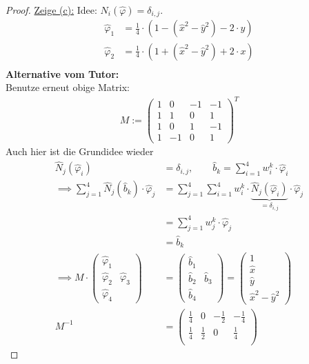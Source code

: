 \documentclass[12pt,a4paper]{article}
\begin{document}
\begin{proof}
\underline{Zeige (c):} 
Idee: $N_i(\hat{\varphi})=\delta_{i,j}$.
\begin{align*}
\hat{\varphi}_1&=\frac{1}{4}\cdot\left(1-\left(\hat{x}^2-\hat{y}^2\right)-2\cdot y\right)\\
\hat{\varphi}_2&=\frac{1}{4}\cdot\left(1+\left(\hat{x}^2-\hat{y}^2\right)+2\cdot x\right)\\
\end{align*}
\textbf{Alternative vom Tutor:}\\
Benutze erneut obige Matrix:
\begin{align*}
M:=\begin{pmatrix}
1 & 0 & -1 & -1\\
1 & 1 & 0 & 1\\
 1 & 0 & 1 & -1\\
 1 & -1 & 0 & 1
\end{pmatrix}^T
\end{align*}
Auch hier ist die Grundidee wieder 
\begin{align*}
\hat{N}_j(\hat{\varphi}_i)&=\delta_{i,j},\qquad
\hat{b}_k=\sum\limits_{i=1}^4 w_i^k\cdot\hat{\varphi}_i\\
\implies
\sum\limits_{j=1}^4\hat{N}_j(\hat{b}_k)\cdot\hat{\varphi}_j
&=\sum\limits_{j=1}^4\sum\limits_{i=1}^4 w_i^k\cdot\underbrace{\hat{N}_j(\hat{\varphi}_i)}_{=\delta_{i,j}}\cdot\hat{\varphi}_j\\
&=\sum\limits_{j=1}^4 w_j^k\cdot\hat{\varphi}_j\\
&=\hat{b}_k\\
\implies
M\cdot\begin{pmatrix}
\hat{\varphi}_1\\ \hat{\varphi}_2 & \hat{\varphi}_3 \\ \hat{\varphi}_4
\end{pmatrix}
&=\begin{pmatrix}
\hat{b}_1\\ \hat{b}_2 & \hat{b}_3 \\ \hat{b}_4
\end{pmatrix}
=\begin{pmatrix}
1\\ \hat{x} \\ \hat{y} \\\hat{x}^2-\hat{y}^2
\end{pmatrix}\\
M^{-1}&=\begin{pmatrix}
\frac{1}{4} & 0 & -\frac{1}{2} & -\frac{1}{4}\\
\frac{1}{4} & \frac{1}{2} & 0 & \frac{1}{4}\\

\end{pmatrix}
\end{align*}
\end{proof}
\end{document}

